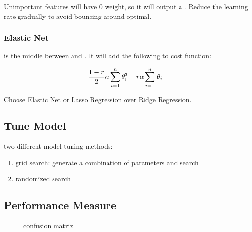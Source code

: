 Unimportant features will have $0$ weight, so it will output a . Reduce the learning rate gradually to avoid bouncing around optimal.


\subsubsection{Elastic Net}
 is the middle between  and . It will add the following to cost function:

\begin{equation}
	\frac{1-r}{2} \alpha \sum_{i=1}^n \theta_i^2 + r \alpha \sum_{i=1}^n \abs{\theta_i}
\end{equation}

Choose Elastic Net or Lasso Regression over Ridge Regression. 






\subsection{Tune Model}
two different model tuning methods:
\begin{enumerate}
	\item grid search: generate a combination of parameters and search
	\item randomized search
\end{enumerate}



\subsection{Performance Measure}

\begin{figure}[H]
\centering	
{}

\caption{confusion matrix}
\end{figure}

